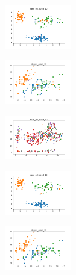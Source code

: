 \begin{figure}[H]
\begin{subfigure}
    \end{subfigure}
    \hfill
    \begin{subfigure}
        \centering
        \includegraphics[width=0.32\textwidth]{img/bl/rand_set_const_10_589741062_clust.png}
    \end{subfigure}
    \hfill
    \begin{subfigure}
        \centering
        \includegraphics[width=0.32\textwidth]{img/bl/iris_set_const_10_277451237_clust.png}
    \end{subfigure}
    \hfill
    \begin{subfigure}
        \centering
        \includegraphics[width=0.32\textwidth]{img/bl/ecoli_set_const_10_277451237_clust.png}
    \end{subfigure}
    \hfill
    \begin{subfigure}
        \centering
        \includegraphics[width=0.32\textwidth]{img/bl/rand_set_const_10_277451237_clust.png}
    \end{subfigure}
    \hfill
    \begin{subfigure}
        \centering
        \includegraphics[width=0.32\textwidth]{img/bl/iris_set_const_10_49258669_clust.png}

\end{subfigure}
\end{figure}
